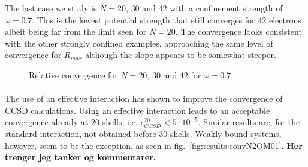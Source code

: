 The last case we study is $N=20$, $30$ and $42$ with a confinement strength of $\omega = 0.7$.
This is the lowest potential strength that still converges for $42$ electrons, albeit being far from the limit seen for $N=20$.
The convergence looks consistent with the other strongly confined examples, approaching the same level of convergence for $R_{max}$ although the slope appears to be somewhat steeper.
\begin{figure}
\begin{center}
\caption{Relative convergence for $N=20$, $30$ and $42$ for $\omega =0.7$.}
\end{center}
\end{figure}


\paragraph{}
The use of an effective interaction has shown to improve the convergence of CCSD calculations.
Using an effective interaction leads to an acceptable convergence already at $20$ shells, i.e. $\epsilon_{CCSD}^{20} < 5\cdot 10^{-5}$. 
Similar results are, for the standard interaction, not obtained before $30$ shells.
Weakly bound systems, however, seem to be the exception, as seen in fig.~\ref{fig:results:convN2OM01}.
{\bf Her trenger jeg tanker og kommentarer.}




